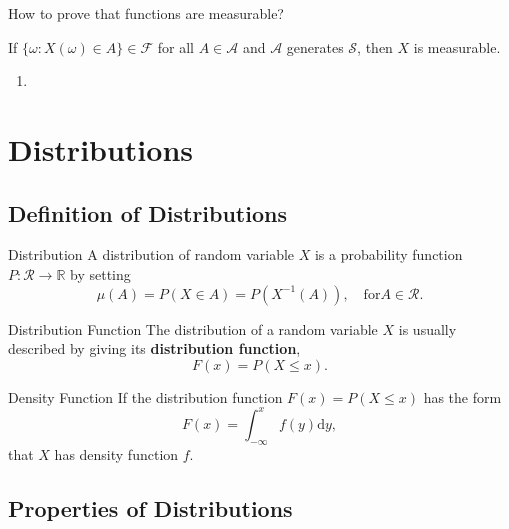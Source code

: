 How to prove that functions are measurable?

\begin{theorem}
    If $\{\omega:X(\omega)\in A\}\in\mathcal{F}$ for all $A\in\mathcal{A}$ and $\mathcal{A}$ generates $\mathcal{S}$, then $X$ is measurable.
\end{theorem}

\begin{enumerate}
    \item 
\end{enumerate}

\section{Distributions}

\subsection{Definition of Distributions}

\begin{definition}{Distribution}{}
    A distribution of random variable $X$ is a probability function $P:\mathcal{R}\rightarrow\mathbb{R}$ by setting
    \begin{equation}
        \mu(A)=P(X\in A)=P\left(X^{-1}(A)\right),\quad\text{for}A\in\mathcal{R}.
    \end{equation}
\end{definition}

\begin{definition}{Distribution Function}{}
    The distribution of a random variable $X$ is usually described by giving its \textbf{distribution function},
    \begin{equation}
        F(x)=P(X\leq x).
    \end{equation}
\end{definition}

\begin{definition}{Density Function}{}
    If the distribution function $F(x)=P(X\leq x)$ has the form
    \begin{equation*}
        F(x)=\int_{-\infty}^{x}f(y)\mathrm{d}y,
    \end{equation*}
   that $X$ has density function $f$.
\end{definition}

\subsection{Properties of Distributions}

